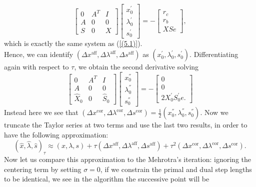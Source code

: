 \documentclass[a4paper,10 pt,titlepage,twoside]{book}
\theoremstyle{plain}
\theoremstyle{definition}
\theoremstyle{remark}
\begin{document}
{{\begin{equation*}
\begin{bmatrix}
0&A^{T}&I \\A&0&0\\S&0&X
\end{bmatrix}\begin{bmatrix}
x_{0}^{'}\\\lambda_{0}^{'}\\s_{0}^{'}
\end{bmatrix}=-\begin{bmatrix}
r_{c}\\r_{b}\\XSe
\end{bmatrix},
\end{equation*}
which is exactly the same system as (\ref{(5.1)}).\\
Hence, we can identify $(\Delta x^{\text{aff}},\Delta \lambda^{\text{aff}},\Delta s^{\text{aff}})$ as $(x^{'}_{0},\lambda^{'}_{0},s^{'}_{0})$. Differentiating again with respect to $\tau$, we obtain the second derivative solving
\begin{equation*}
\begin{bmatrix}
0&A^{T}&I \\A&0&0\\\hat{X}_{0}&0&\hat{S}_{0}
\end{bmatrix}\begin{bmatrix}
x_{0}^{''}\\\lambda_{0}^{''}\\s_{0}^{''}
\end{bmatrix}=-\begin{bmatrix}
0\\0\\2X^{'}_{0}S^{'}_{0}e.
\end{bmatrix}
\end{equation*}
Instead here we see that $(\Delta x^{\text{cor}},\Delta \lambda^{\text{cor}},\Delta s^{\text{cor}})=\frac{1}{2}(x^{''}_{0},\lambda^{''}_{0},s^{''}_{0})$. Now we truncate the Taylor series at two terms and use the last two results, in order to have the following approximation:
\begin{equation*}
(\hat{x},\hat{\lambda},\hat{s})_{\tau}\approx(x, \lambda, s)+ \tau(\Delta x^{\text{aff}},\Delta \lambda^{\text{aff}},\Delta s^{\text{aff}})+\tau^{2}(\Delta x^{\text{cor}},\Delta \lambda^{\text{cor}},\Delta s^{\text{cor}}).
\end{equation*}
Now let us compare this approximation to the Mehrotra's iteration: ignoring the centering term by setting $\sigma =0$, if we constrain the primal and dual step lengths to be identical, we see in the algorithm the successive point will be
}}
\end{document}
